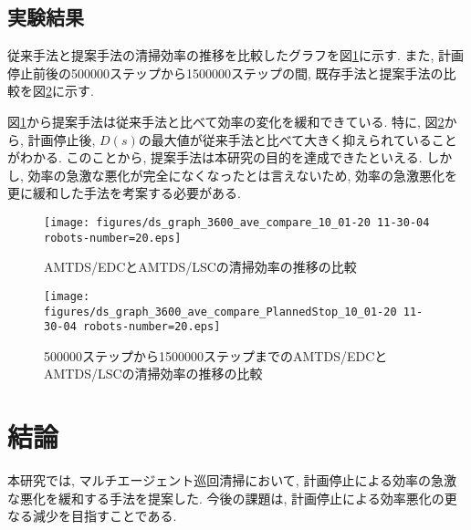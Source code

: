 \documentclass[10pt,a4j,twocolumn]{jsarticle}
\begin{document}
\subsection{実験結果}
従来手法と提案手法の清掃効率の推移を比較したグラフを図\ref{fig:AMTDS/EDCとAMTDS/LSCの清掃効率の推移の比較}に示す. また, 計画停止前後の500000ステップから1500000ステップの間, 既存手法と提案手法の比較を図\ref{fig:500000ステップから1500000ステップまでのAMTDS/EDCとAMTDS/LSCの清掃効率の推移の比較}に示す.
\par
図\ref{fig:AMTDS/EDCとAMTDS/LSCの清掃効率の推移の比較}から提案手法は従来手法と比べて効率の変化を緩和できている. 特に, 図\ref{fig:500000ステップから1500000ステップまでのAMTDS/EDCとAMTDS/LSCの清掃効率の推移の比較}から, 計画停止後, $D(s)$の最大値が従来手法と比べて大きく抑えられていることがわかる. このことから, 提案手法は本研究の目的を達成できたといえる. しかし, 効率の急激な悪化が完全になくなったとは言えないため, 効率の急激悪化を更に緩和した手法を考案する必要がある.
\begin{figure}
\centering
\texttt{[image: figures/ds\_graph\_3600\_ave\_compare\_10\_01-20 11-30-04 robots-number=20.eps]}
\caption{AMTDS/EDCとAMTDS/LSCの清掃効率の推移の比較}
\label{fig:AMTDS/EDCとAMTDS/LSCの清掃効率の推移の比較}
\end{figure}

\begin{figure}
\centering
\texttt{[image: figures/ds\_graph\_3600\_ave\_compare\_PlannedStop\_10\_01-20 11-30-04 robots-number=20.eps]}
\caption{500000ステップから1500000ステップまでのAMTDS/EDCとAMTDS/LSCの清掃効率の推移の比較}
\label{fig:500000ステップから1500000ステップまでのAMTDS/EDCとAMTDS/LSCの清掃効率の推移の比較}
\end{figure}

\section{結論}
本研究では, マルチエージェント巡回清掃において, 計画停止による効率の急激な悪化を緩和する手法を提案した. 今後の課題は, 計画停止による効率悪化の更なる減少を目指すことである. 



\end{document}
